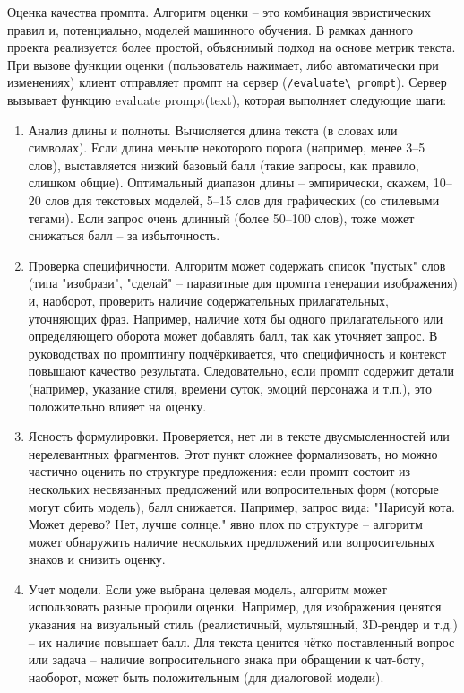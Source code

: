 Оценка качества промпта. Алгоритм оценки – это комбинация эвристических правил и, потенциально, моделей машинного обучения. В рамках данного проекта реализуется более простой, объяснимый подход на основе метрик текста. При вызове функции оценки (пользователь нажимает, либо автоматически при изменениях) клиент отправляет промпт на сервер (\verb|/evaluate\ prompt|). Сервер вызывает функцию evaluate prompt(text), которая выполняет следующие шаги:
\begin{enumerate}[label=\arabic*]
    \item Анализ длины и полноты. Вычисляется длина текста (в словах или символах). Если длина меньше некоторого порога (например, менее 3–5 слов), выставляется низкий базовый балл (такие запросы, как правило, слишком общие). Оптимальный диапазон длины – эмпирически, скажем, 10–20 слов для текстовых моделей, 5–15 слов для графических (со стилевыми тегами). Если запрос очень длинный (более 50–100 слов), тоже может снижаться балл – за избыточность.
    \item Проверка специфичности. Алгоритм может содержать список "пустых" слов (типа "изобрази", "сделай" – паразитные для промпта генерации изображения) и, наоборот, проверить наличие содержательных прилагательных, уточняющих фраз. Например, наличие хотя бы одного прилагательного или определяющего оборота может добавлять балл, так как уточняет запрос. В руководствах по промптингу подчёркивается, что специфичность и контекст повышают качество результата\cite{promptingguide:basics}. Следовательно, если промпт содержит детали (например, указание стиля, времени суток, эмоций персонажа и т.п.), это положительно влияет на оценку.
    \item Ясность формулировки. Проверяется, нет ли в тексте двусмысленностей или нерелевантных фрагментов. Этот пункт сложнее формализовать, но можно частично оценить по структуре предложения: если промпт состоит из нескольких несвязанных предложений или вопросительных форм (которые могут сбить модель), балл снижается. Например, запрос вида: "Нарисуй кота. Может дерево? Нет, лучше солнце." явно плох по структуре – алгоритм может обнаружить наличие нескольких предложений или вопросительных знаков и снизить оценку.
    \item Учет модели. Если уже выбрана целевая модель, алгоритм может использовать разные профили оценки. Например, для изображения ценятся указания на визуальный стиль (реалистичный, мультяшный, 3D-рендер и т.д.) – их наличие повышает балл. Для текста ценится чётко поставленный вопрос или задача – наличие вопросительного знака при обращении к чат-боту, наоборот, может быть положительным (для диалоговой модели).

\end{enumerate}
